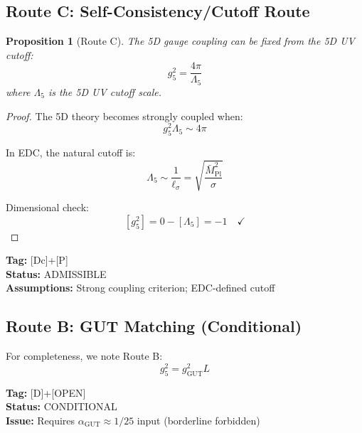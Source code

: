 \documentclass[11pt,a4paper]{article}
\newtheorem{proposition}{Proposition}[section]
\begin{document}
\subsection{Route C: Self-Consistency/Cutoff Route}
\label{subsec:route-c}

\begin{proposition}[Route C]
\label{prop:route-c}
The 5D gauge coupling can be fixed from the 5D UV cutoff:
\begin{equation}
\label{eq:route-c-formula}
g_5^2 = \frac{4\pi}{\Lambda_5}
\end{equation}
where $\Lambda_5$ is the 5D UV cutoff scale.
\end{proposition}

\begin{proof}
The 5D theory becomes strongly coupled when:
\begin{equation}
\label{eq:strong-coupling}
g_5^2 \Lambda_5 \sim 4\pi
\end{equation}

In EDC, the natural cutoff is:
\begin{equation}
\label{eq:lambda5-edc}
\Lambda_5 \sim \frac{1}{\ell_\sigma} = \sqrt{\frac{\bar{M}_{\text{Pl}}^2}{\sigma}}
\end{equation}

Dimensional check:
\begin{equation}
\label{eq:route-c-dim}
[g_5^2] = 0 - [\Lambda_5] = -1 \quad \checkmark
\end{equation}
\end{proof}

\textbf{Tag:} [Dc]+[P] \\
\textbf{Status:} ADMISSIBLE \\
\textbf{Assumptions:} Strong coupling criterion; EDC-defined cutoff

\subsection{Route B: GUT Matching (Conditional)}
\label{subsec:route-b}

For completeness, we note Route B:
\begin{equation}
\label{eq:route-b-formula}
g_5^2 = g_{\text{GUT}}^2 L
\end{equation}

\textbf{Tag:} [D]+[OPEN] \\
\textbf{Status:} CONDITIONAL \\
\textbf{Issue:} Requires $\alpha_{\text{GUT}} \approx 1/25$ input (borderline forbidden)
\end{document}
